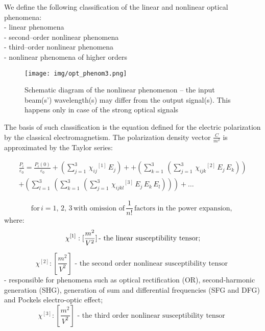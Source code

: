 \documentclass[12pt,twoside,a4paper]{article}
\numberwithin{equation}{subsection}
\numberwithin{figure}{subsection}
\begin{document}
We define the following classification of the linear and nonlinear optical phenomena: \\
- linear phenomena \\
- second--order nonlinear phenomena \\ 
- third--order nonlinear phenomena \\
- nonlinear phenomena of higher orders
\begin{figure} 
  \texttt{[image: img/opt\_phenom3.png]}
  \caption{Schematic diagram of the nonlinear phenomenon -- the input beam(s') wavelength(s) may differ from the output signal(s).
  This happens only in case of the strong optical signals
  \label{fig:nonlinear_phenomenom}}
\end{figure}

The basis of such classification is the equation defined for the electric polarization by the classical electromagnetism. The
polarization density vector $\frac{C}{m^2}$ is approximated by the Taylor series: 

\begin{equation} \label{eq:polarization_taylor}
  \begin{split}
    \frac {{P_{i}}}{{\varepsilon_{0}}}=\frac {{P_{i}}(0)}{{\varepsilon_{0}}}
    + (\sum_{j=1}^{3}\,{\chi_{ij}}^{[1]}\,{E_{j}}) +
    + (\sum_{k=1}^{3}\,(\sum_{j=1}^{3}\,{\chi_{{ijk}}}^{[2]}\,{E_{j}}\,{E_{k}}))  \\
    + \left(  \! \sum_{l=1}^{3}\,(\sum_{k=1}^{3}\, (\sum_{j=1}^{3}\,{\chi_{ijkl}}^{[3]}\,{E_{j}}\,{E_{k}}\,{E_{l}}))
    \! \right) + \ldots
  \end{split}
\end{equation}

\begin{equation*}
  \mbox{for}\,i=1, \,2, \,3\,\mbox{with omission of}\,\frac {1}{n\mathrm{!}}\, \mbox{factors in the power expansion, }
\end{equation*}
where: 
\begin{equation*}
  \chi ^{[1]} : [\frac {m^{2}}{V^{2}}]
  \mbox{\,- the linear susceptibility tensor;}
\end{equation*}

\begin{equation*}
  \chi ^{[2]} : [\frac {m^{2}}{V^{2}}]
  \mbox{ - the second order nonlinear susceptibility tensor  }
\end{equation*}
- responsible for phenomena such as optical rectification (OR), second-harmonic generation (SHG), generation of sum and
differential frequencies (SFG and DFG) and Pockels electro-optic effect;
\begin{equation*}
  \chi ^{[3]} : [\frac {m^{2}}{V^{2}}]
  \mbox{ - the third order nonlinear susceptibility tensor  }
\end{equation*}
\end{document}
